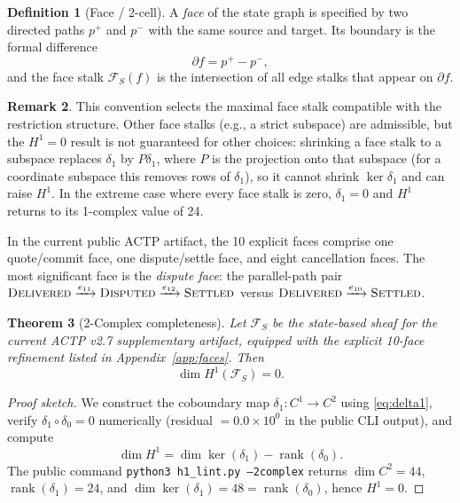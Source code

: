 \documentclass[11pt]{article}
\theoremstyle{plain}
\newtheorem{theorem}{Theorem}[section]
\theoremstyle{definition}
\newtheorem{definition}[theorem]{Definition}
\newtheorem{remark}[theorem]{Remark}
\newcommand{\Fsh}{\mathcal{F}}         %
\newcommand{\Cone}{C^{1}}
\newcommand{\Ctwo}{C^{2}}
\newcommand{\Hone}{H^{1}}
\newcommand{\deltazero}{\delta_{0}}
\newcommand{\deltaone}{\delta_{1}}
\newcommand{\rank}{\operatorname{rank}}
\newcommand{\dimn}{\operatorname{dim}}
\newcommand{\sDELIV}{\textsc{Delivered}}
\newcommand{\sSETTL}{\textsc{Settled}}
\newcommand{\sDISP}{\textsc{Disputed}}
\begin{document}
\begin{definition}[Face / 2-cell]\label{def:face}
A \emph{face} of the state graph is specified by two directed paths
$p^{+}$ and $p^{-}$ with the same source and target.  Its boundary is the
formal difference
\[
  \partial f = p^{+} - p^{-},
\]
and the face stalk $\Fsh_S(f)$ is the intersection of all edge stalks that
appear on $\partial f$.
\end{definition}

\begin{remark}
This convention selects the maximal face stalk compatible with the restriction
structure.  Other face stalks (e.g., a strict subspace) are admissible, but
the $\Hone = 0$ result is not guaranteed for other choices: shrinking a face
stalk to a subspace replaces $\delta_1$ by $P\delta_1$, where $P$ is the
projection onto that subspace (for a coordinate subspace this removes rows of
$\delta_1$), so it cannot shrink $\ker\delta_1$ and can raise $\Hone$.
In the extreme case where every face stalk is zero, $\delta_1 = 0$ and $\Hone$
returns to its 1-complex value of 24.
\end{remark}

In the current public ACTP artifact, the 10 explicit faces comprise one
quote/commit face, one dispute/settle face, and eight cancellation faces.
The most significant face is the \emph{dispute face}: the parallel-path pair
$\sDELIV \xrightarrow{e_{11}} \sDISP \xrightarrow{e_{12}} \sSETTL$ versus
$\sDELIV \xrightarrow{e_{10}} \sSETTL$.

\begin{theorem}[2-Complex completeness]\label{thm:completeness}
Let $\Fsh_S$ be the state-based sheaf for the current ACTP v2.7 supplementary
artifact, equipped with the explicit 10-face refinement listed in
Appendix~\ref{app:faces}.  Then
\[
  \dimn\Hone(\Fsh_S) = 0.
\]
\end{theorem}

\begin{proof}[Proof sketch]
We construct the coboundary map $\deltaone \colon \Cone \to \Ctwo$ using
\eqref{eq:delta1}, verify $\deltaone \circ \deltazero = 0$ numerically
(residual $= 0.0 \times 10^{0}$ in the public CLI output), and compute
\[
  \dimn\Hone = \dimn\ker(\deltaone) - \rank(\deltazero).
\]
The public command \texttt{python3 h1\_lint.py --2complex} returns
$\dimn\Ctwo = 44$, $\rank(\deltaone) = 24$, and
$\dimn\ker(\deltaone) = 48 = \rank(\deltazero)$, hence $\Hone = 0$.
\end{proof}
\end{document}
